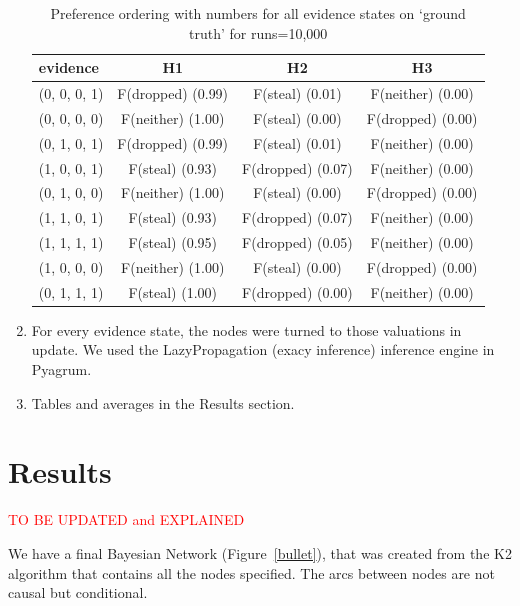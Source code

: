 \documentclass[12pt]{article}
\begin{document}
\begin{enumerate}
\begin{table}[htbp]
\begin{center}
\begin{tabular}{|l|c|c|c|}
\hline
evidence & H1 & H2 & H3 \\
\hline
(0, 0, 0, 1)&F(dropped) (0.99) & F(steal) (0.01) & F(neither) (0.00) \\
(0, 0, 0, 0)&F(neither) (1.00) & F(steal) (0.00) & F(dropped) (0.00) \\
(0, 1, 0, 1)&F(dropped) (0.99) & F(steal) (0.01) & F(neither) (0.00) \\
(1, 0, 0, 1)&F(steal) (0.93) & F(dropped) (0.07) & F(neither) (0.00) \\
(0, 1, 0, 0)&F(neither) (1.00) & F(steal) (0.00) & F(dropped) (0.00) \\
(1, 1, 0, 1)&F(steal) (0.93) & F(dropped) (0.07) & F(neither) (0.00) \\
(1, 1, 1, 1)&F(steal) (0.95) & F(dropped) (0.05) & F(neither) (0.00) \\
(1, 0, 0, 0)&F(neither) (1.00) & F(steal) (0.00) & F(dropped) (0.00) \\
(0, 1, 1, 1)&F(steal) (1.00) & F(dropped) (0.00) & F(neither) (0.00) \\
\hline
\end{tabular}
\end{center}
\caption{ Preference ordering with numbers for all evidence states on `ground truth' for runs=10,000}
\label{heretic}
\end{table}

\item For every evidence state, the nodes were turned to those valuations in update. We used the LazyPropagation (exacy inference) inference engine in Pyagrum.

\item Tables and averages in the Results section.

\end{enumerate}



\section{Results}


 \textcolor{red} {TO BE UPDATED and EXPLAINED}

We have a final Bayesian Network (Figure~\ref{bullet}), that was created from the K2 algorithm that contains all the nodes specified. The arcs between nodes are not causal but conditional. 
\end{document}
